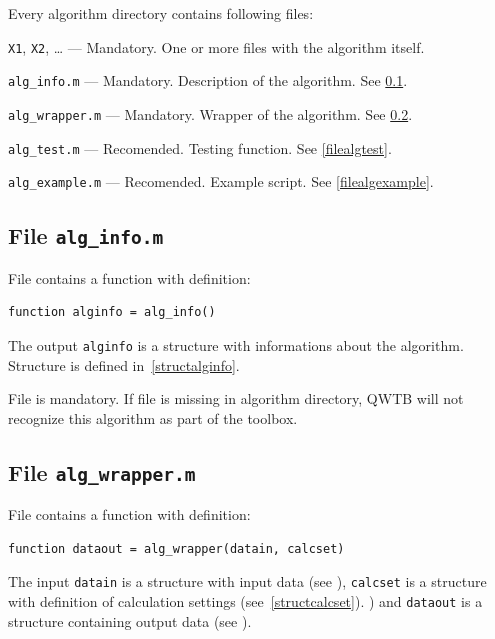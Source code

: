 \documentclass[12pt,a4paper,oneside]{report} %
\begin{document}
Every algorithm directory contains following files:
\begin{tightdesc}
        \item [{\tt X1}, {\tt X2}, \dots] ---  Mandatory. One or more files with the algorithm itself.
        \item [{\tt alg\_info.m}] ---  Mandatory. Description of the algorithm. See \ref{filealginfo}.
        \item [{\tt alg\_wrapper.m}] ---  Mandatory. Wrapper of the algorithm. See \ref{filealgwrapper}.
        \item [{\tt alg\_test.m}] ---  Recomended. Testing function. See \ref{filealgtest}.
        \item [{\tt alg\_example.m}] ---  Recomended. Example script. See \ref{filealgexample}.
\end{tightdesc}

\subsection{File {\tt alg\_info.m}} %
\label{filealginfo}
File contains a function with definition:

\begin{lstlisting}
function alginfo = alg_info()
\end{lstlisting}

The output \lstinline{alginfo} is a structure with informations about the algorithm. Structure is
defined in~\ref{structalginfo}.

File is mandatory. If file is missing in algorithm directory, QWTB will not recognize this
algorithm as part of the toolbox.

\subsection{File {\tt alg\_wrapper.m}} %
\label{filealgwrapper}
File contains a function with definition:

\begin{lstlisting}
function dataout = alg_wrapper(datain, calcset)
\end{lstlisting}

The input \lstinline{datain} is a structure with input data (see %
), \lstinline{calcset} is a structure with definition of calculation settings
(see~\ref{structcalcset}).
) and \lstinline{dataout} is a structure containing output data (see %
).
\end{document}
